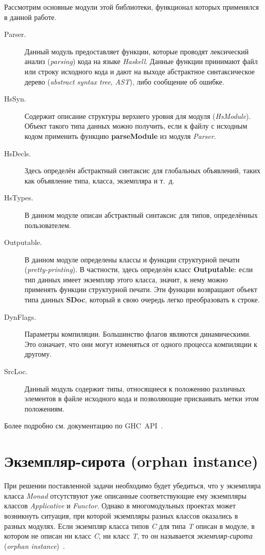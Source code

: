 Рассмотрим основные модули этой библиотеки, функционал которых применялся в данной работе.
\begin{description}
\item[Parser.] Данный модуль предоставляет функции, которые проводят лексический анализ (\textit{parsing}) кода на языке \textit{Haskell}. Данные функции принимают файл или строку исходного кода и дают на выходе абстрактное синтаксическое дерево (\textit{abstract syntax tree}, \textit{AST}), либо сообщение об ошибке.
\item[HsSyn.] Содержит описание структуры верхнего уровня для модуля (\textit{HsModule}). Объект такого типа данных можно получить, если к файлу с исходным кодом применить функцию \textbf{parseModule} из модуля \textit{Parser}.
\item[HsDecls.] Здесь определён абстрактный синтаксис для глобальных объявлений, таких как объявление типа, класса, экземпляра и т.~д.
\item[HsTypes.] В данном модуле описан абстрактный синтаксис для типов, определённых пользователем.
\item[Outputable.] В данном модуле определены классы и функции структурной печати (\textit{pretty-printing}). В частности, здесь определён класс \textbf{Outputable}: если тип данных имеет экземпляр этого класса, значит, к нему можно применять функции структурной печати. Эти функции возвращают объект типа данных \textbf{SDoc}, который в свою очередь легко преобразовать к строке.
\item[DynFlags.] Параметры компиляции. Большинство флагов являются динамическими. Это означает, что они могут изменяться от одного процесса компиляции к другому.
\item[SrcLoc.] Данный модуль содержит типы, относящиеся к положению различных элементов в файле исходного кода и позволяющие присваивать метки этом положениям. 
\end{description}

Более подробно см. документацию по GHC~API~\autocite{apidoc}.

\section{Экземпляр-сирота (orphan instance)}
При решении поставленной задачи необходимо будет убедиться, что у экземпляра класса \textit{Monad} отсутствуют уже описанные соответствующие ему экземпляры классов \textit{Applicative} и \textit{Functor}. Однако в многомодульных проектах может возникнуть ситуация, при которой экземпляры разных классов оказались в разных модулях. Если экземпляр класса типов \textit{C} для типа \textit{T} описан в модуле, в котором не описан ни класс \textit{C}, ни класс \textit{T}, то он называется \textit{экземпляр-сирота} (\textit{orphan instance})~\autocite{orphinst}. 


